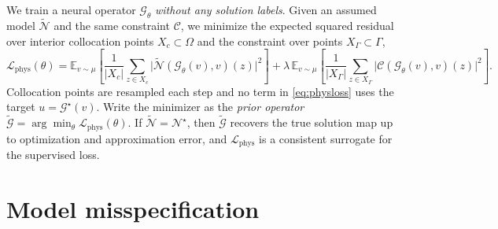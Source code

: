 \documentclass[11pt]{article}
\newcommand{\E}{\mathbb{E}}
\newcommand{\dom}{\Omega}
\newcommand{\Gtrue}{\mathcal{G}^{\star}}
\newcommand{\Gprior}{\widetilde{\mathcal{G}}}
\newcommand{\Ntrue}{\mathcal{N}^{\star}}
\newcommand{\Nass}{\widetilde{\mathcal{N}}}
\begin{document}
We train a neural operator $\mathcal{G}_\theta$ \emph{without any solution labels}. Given an
assumed model $\Nass$ and the same constraint $\mathcal{C}$, we minimize the expected squared
residual over interior collocation points $X_c\subset\dom$ and the constraint over points
$X_\Gamma\subset\Gamma$,
\begin{equation}
\label{eq:physloss}
\mathcal{L}_{\mathrm{phys}}(\theta)
= \E_{v\sim\mu}\!\left[
\frac{1}{|X_c|}\sum_{z\in X_c}\bigl|\Nass\!\left(\mathcal{G}_\theta(v), v\right)(z)\bigr|^{2}
\right]
+ \lambda\,
\E_{v\sim\mu}\!\left[
\frac{1}{|X_\Gamma|}\sum_{z\in X_\Gamma}\bigl|\mathcal{C}\!\left(\mathcal{G}_\theta(v), v\right)(z)\bigr|^{2}
\right].
\end{equation}
Collocation points are resampled each step and no term in \eqref{eq:physloss} uses the target
$u=\Gtrue(v)$. Write the minimizer as the \emph{prior operator}
$\Gprior = \arg\min_\theta \mathcal{L}_{\mathrm{phys}}(\theta)$. If $\Nass=\Ntrue$, then
$\Gprior$ recovers the true solution map up to optimization and approximation error, and
$\mathcal{L}_{\mathrm{phys}}$ is a consistent surrogate for the supervised loss.

\section{Model misspecification}
\label{sec:misspec}
\end{document}
